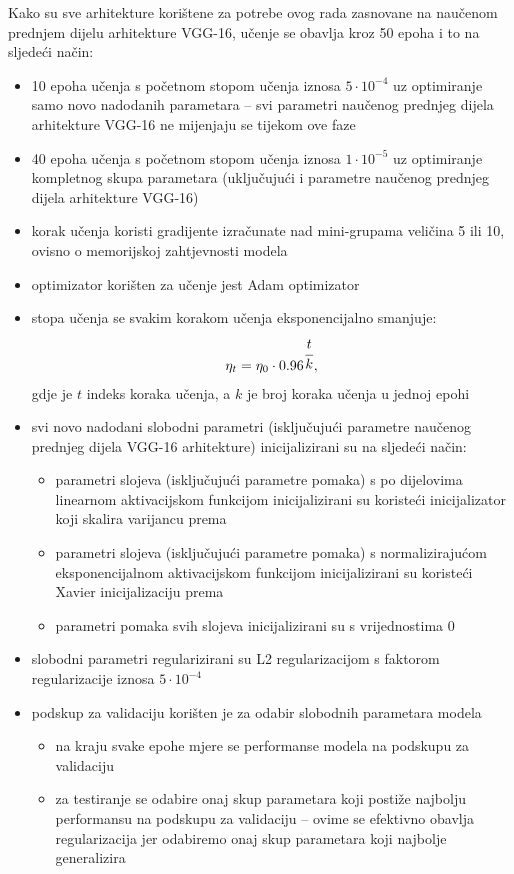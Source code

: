 \documentclass[times, utf8, diplomski, numeric]{fer}
\begin{document}
Kako su sve arhitekture korištene za potrebe ovog rada zasnovane na naučenom prednjem dijelu arhitekture VGG-16, učenje se obavlja kroz 50 epoha i to na sljedeći način:
\begin{itemize}
 \item 10 epoha učenja s početnom stopom učenja iznosa $5\cdot10^{-4}$ uz optimiranje samo novo nadodanih parametara -- svi parametri naučenog prednjeg dijela arhitekture VGG-16 ne mijenjaju se tijekom ove faze
 \item 40 epoha učenja s početnom stopom učenja iznosa $1\cdot10^{-5}$ uz optimiranje kompletnog skupa parametara (uključujući i parametre naučenog prednjeg dijela arhitekture VGG-16)
 \item korak učenja koristi gradijente izračunate nad mini-grupama veličina 5 ili 10, ovisno o memorijskoj zahtjevnosti modela
 \item optimizator korišten za učenje jest Adam optimizator
 \item stopa učenja se svakim korakom učenja eksponencijalno smanjuje:
 \begin{align}
  \eta_{t}=\eta_0 \cdot 0.96^{\cfrac{t}{k}},
 \end{align}
gdje je $t$ indeks koraka učenja, a $k$ je broj koraka učenja u jednoj epohi
 \item svi novo nadodani slobodni parametri (isključujući parametre naučenog prednjeg dijela VGG-16 arhitekture) inicijalizirani su na sljedeći način:
 \begin{itemize}
  \item parametri slojeva (isključujući parametre pomaka) s po dijelovima linearnom aktivacijskom funkcijom inicijalizirani su koristeći inicijalizator koji skalira varijancu prema \citep{article:delving_deep_into_rectifiers}
  \item parametri slojeva (isključujući parametre pomaka) s normalizirajućom eksponencijalnom aktivacijskom funkcijom inicijalizirani su koristeći Xavier inicijalizaciju prema \citep{article:delving_deep_into_rectifiers}
  \item parametri pomaka svih slojeva inicijalizirani su s vrijednostima 0
 \end{itemize}

 \item slobodni parametri regularizirani su L2 regularizacijom s faktorom regularizacije iznosa $5\cdot10^{-4}$
 \item podskup za validaciju korišten je za odabir slobodnih parametara modela
 \begin{itemize}
  \item na kraju svake epohe mjere se performanse modela na podskupu za validaciju
  \item za testiranje se odabire onaj skup parametara koji postiže najbolju performansu na podskupu za validaciju -- ovime se efektivno obavlja regularizacija jer odabiremo onaj skup parametara koji najbolje generalizira
 \end{itemize}
\end{itemize}
\end{document}
